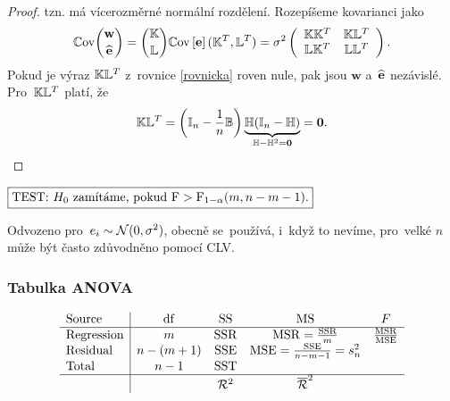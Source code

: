 \begin{proof}
 tzn. má vícerozměrné normální rozdělení. Rozepíšeme kovarianci jako
  \begin{equation}\label{rovnicka}
  \Cov\binom{\textbf{w}}{\heb} = \binom{\Km}{\Lm}\Cov\left[\eb\right](\Km^T,\Lm^T) = \sigma^2 \left(\begin{array}{cc}
  \Km\Km^T&\Km\Lm^T  \\
  \Lm\Km^T & \Lm\Lm^T
  \end{array}
  \right).
  \end{equation}
  Pokud je výraz $\Km\Lm^T$ z~rovnice \eqref{rovnicka} roven nule, pak jsou $\textbf{w}$ a~$\heb$ nezávislé.
  Pro~$\Km\Lm^T$ platí, že
 $$ \Km\Lm^T = \left(\In-\frac{1}{n}\Bm \right)\underbrace{\Hm(\In-\Hm)}_{\Hm-\Hm^2 = \nula} = \nula. $$
\end{proof}

 $\test{\FF>\FF_{1-\alpha}(m,n-m-1)}$

 \begin{remark}
 	Odvozeno pro~$e_i\sim\NN(0,\sigma^2)$, obecně se~používá, i~když to nevíme, pro~velké $n$ může být často zdůvodněno pomocí CLV.
 \end{remark}
\subsubsection{Tabulka ANOVA}
 $$ \begin{array}{l|cccc}
\text{Source}& \mathrm{df} & \mathrm{SS} & \mathrm{MS} & F \\\hline
\text{Regression} & m & \SSR & \MSR = \frac{\SSR}{m} & \frac{\MSR}{\MSE} \\
\text{Residual} & n-(m+1) & \SSE & \MSE = \frac{\SSE}{n-m-1} = s_n^2 &  \\
\text{Total} & n-1 & \SST &  &  \\\hline
&  & \RR^2 & \overline{\RR}^2 &
\end{array}
 $$
